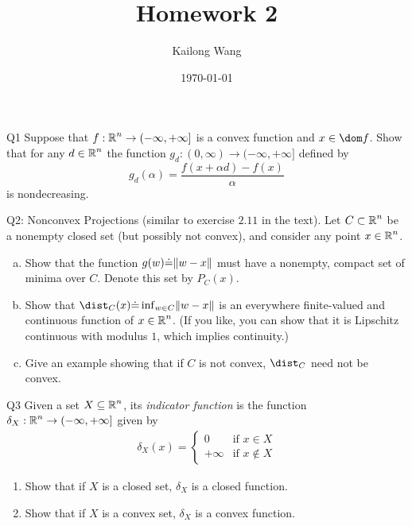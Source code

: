 \documentclass{article}
\title{Homework 2}
\author{Kailong Wang}
\date{\today}
\begin{document}
\maketitle

\begin{problem}
    {Q1}
    Suppose that $f:\operatorname{\mathbb{R}}^n\rightarrow(-\infty, +\infty]$ is a convex function and $x \in \dom f$. Show that for any $d\in\operatorname{\mathbb{R}}^n$ the function $g_d:(0,\infty)\rightarrow(-\infty,+\infty]$ defined by
    \[
        g_d(\alpha) = \frac{f(x+\alpha d)-f(x)}{\alpha}
    \]
    is nondecreasing.
\end{problem}

\begin{problem}
    {Q2: Nonconvex Projections (similar to exercise $2.11$ in the text).}
    Let $C\subset\operatorname{\mathbb{R}}^n$ be a nonempty closed set (but possibly not convex), and consider any point $x\in\operatorname{\mathbb{R}}^n$.
    \begin{enumerate}[(a)]
        \item Show that the function $g(w)\dot{=}\lVert w-x\rVert$ must have a nonempty, compact set of minima over $C$. Denote this set by $P_C(x)$.
        \item Show that $\dist_C(x)\dot{=}\inf_{w\in C}\norm{w-x}$ is an everywhere finite-valued and continuous function of $x\in\operatorname{\mathbb{R}}^n$. (If you like, you can show that it is Lipschitz continuous with modulus $1$, which implies continuity.)
        \item Give an example showing that if $C$ is not convex, $\dist_C$ need not be convex.
    \end{enumerate}
\end{problem}

\begin{problem}
    {Q3}
    Given a set $X\subseteq\operatorname{\mathbb{R}}^n$, its \textit{indicator function} is the function $\delta_X:\operatorname{\mathbb{R}}^n\rightarrow(-\infty, +\infty]$ given by
    \begin{align*}
        \delta_X(x) = \begin{cases}
            0 & \text{if } x\in X\\
            +\infty & \text{if } x\notin X
        \end{cases}
    \end{align*}
    \begin{enumerate}
        \item Show that if $X$ is a closed set, $\delta_X$ is a closed function.
        \item Show that if $X$ is a convex set, $\delta_X$ is a convex function.
    \end{enumerate}
\end{problem}
\end{document}
